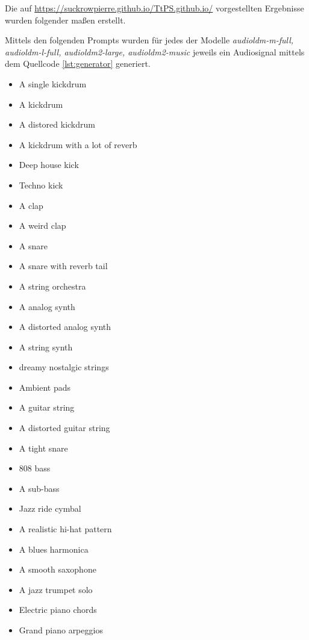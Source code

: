 \documentclass[
  a4paper,  %
  twoside,  %
  bibliography=totoc,
  headsepline,
  cleardoublepage=empty,
  parskip=half,
  draft=false
]{scrbook}
\begin{document}
Die auf \url{https://suckrowpierre.github.io/TtPS.github.io/}\cite{pierre-louis_suckrow_text-zu-spielbarem-klang_nodate} vorgestellten Ergebnisse wurden folgender maßen erstellt.

Mittels den folgenden Prompts wurden für jedes der Modelle \emph{audioldm-m-full, audioldm-l-full, audioldm2-large, audioldm2-music} \cite{liu_audioldm_2023,liu_audioldm2_2023} jeweils ein Audiosignal mittels dem Quellcode \ref{lst:generator}\cite{pierre-louis_suckrow_thesismodelsresultsgenerator_2023} generiert. 

\begin{multicols}{4}
\fontsize{8pt}{11pt}\selectfont
\begin{itemize}
    \item A single kickdrum
    \item A kickdrum
    \item A distored kickdrum
    \item A kickdrum with a lot of reverb
    \item Deep house kick
    \item Techno kick
    \item A clap
    \item A weird clap
    \item A snare
    \item A snare with reverb tail
    \item A string orchestra
    \item A analog synth
    \item A distorted analog synth
    \item A string synth
    \item dreamy nostalgic strings
    \item Ambient pads
    \item A guitar string
    \item A distorted guitar string
    \item A tight snare
    \item 808 bass
    \item A sub-bass
    \item Jazz ride cymbal
    \item A realistic hi-hat pattern
    \item A blues harmonica
    \item A smooth saxophone
    \item A jazz trumpet solo
    \item Electric piano chords
    \item Grand piano arpeggios

\end{itemize}
\end{multicols}
\end{document}
